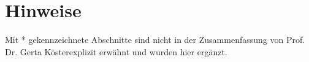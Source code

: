 \documentclass[a4paper]{article}
\author{\pProfessor}
\title{\pTitle}
\newcommand{\pProfessor}{Prof. Dr. Gerta Köster}
\begin{document}
\maketitle
\newpage
\tableofcontents
\newpage
\listoffigures
\newpage

\theoremstyle{definition}
\newtheorem{satz}{Satz}[section] 
\newtheorem{definition}{Definition}[section] 
\newtheorem{lemma}{Lemma}[section] 
\newtheorem{behauptung}{Behauptung}[section] 
\newtheorem{beispiel}{Beispiel}
\newenvironment{beweis}{\begin{proof}}{\end{proof}} %

\part{Hinweise}
Mit * gekennzeichnete Abschnitte sind nicht in der Zusammenfassung von \pProfessor explizit erwähnt und wurden hier ergänzt. 







\newpage
\renewcommand{\indexname}{Stichwortverzeichnis} %
\printindex %
\end{document}
